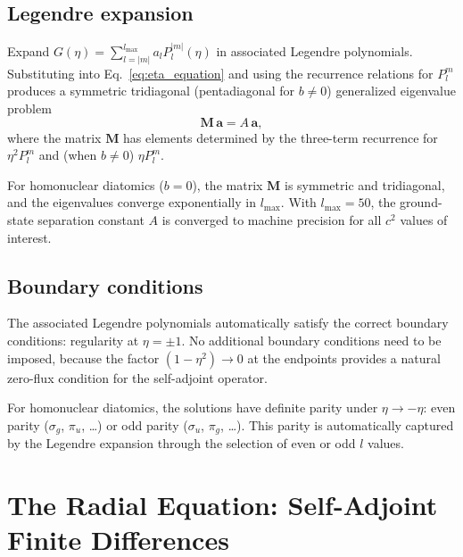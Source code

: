 \documentclass[aps,pra,twocolumn,superscriptaddress,longbibliography]{revtex4-2}
\begin{document}
\subsection{Legendre expansion}

Expand $G(\eta) = \sum_{l=|m|}^{l_{\max}} a_l P_l^{|m|}(\eta)$
in associated Legendre polynomials.  Substituting into
Eq.~\eqref{eq:eta_equation} and using the recurrence relations
for $P_l^m$ produces a symmetric tridiagonal (pentadiagonal for
$b \neq 0$) generalized eigenvalue problem
\begin{equation}
  \mathbf{M}\,\mathbf{a} = A\,\mathbf{a},
  \label{eq:angular_eigenproblem}
\end{equation}
where the matrix $\mathbf{M}$ has elements determined by the
three-term recurrence for $\eta^2 P_l^m$ and (when $b \neq 0$)
$\eta P_l^m$.

For homonuclear diatomics ($b = 0$), the matrix $\mathbf{M}$ is
symmetric and tridiagonal, and the eigenvalues converge exponentially
in $l_{\max}$.  With $l_{\max} = 50$, the ground-state separation
constant $A$ is converged to machine precision for all $c^2$ values
of interest.

\subsection{Boundary conditions}

The associated Legendre polynomials automatically satisfy the correct
boundary conditions: regularity at $\eta = \pm 1$.  No additional
boundary conditions need to be imposed, because the factor
$(1 - \eta^2) \to 0$ at the endpoints provides a natural zero-flux
condition for the self-adjoint operator.

For homonuclear diatomics, the solutions have definite parity under
$\eta \to -\eta$: even parity ($\sigma_g$, $\pi_u$, \ldots) or odd
parity ($\sigma_u$, $\pi_g$, \ldots).  This parity is automatically
captured by the Legendre expansion through the selection of even or
odd $l$ values.


\section{The Radial Equation: Self-Adjoint Finite Differences}
\label{sec:radial}
\end{document}
